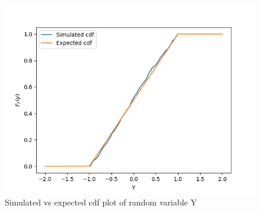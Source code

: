 \documentclass[journal,12pt,twocolumn]{IEEEtran}
\begin{document}
\begin{figure}[h]
    \centering
    \includegraphics[width=\linewidth]{simulated_cdf.png}
    \caption{Simulated vs expected cdf plot of random variable Y}
    \label{cdf_plot}
\end{figure}
\end{document}
